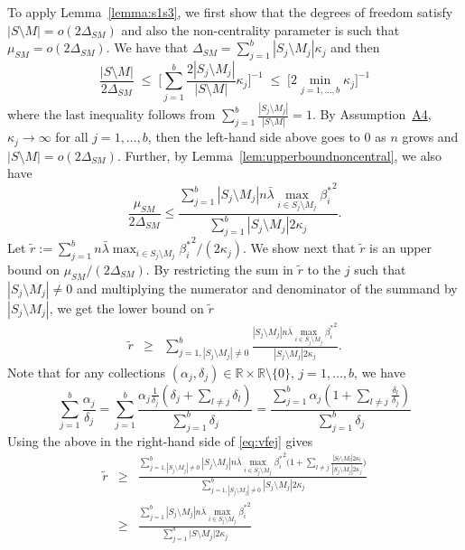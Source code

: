 \documentclass[
  12pt]{article}
\newcommand{\R}{\mathbb{R}}
\begin{document}
To apply Lemma~\ref{lemma:s1s3}, we first show that the degrees of freedom satisfy $|S\setminus M|=o(2\Delta_{SM})$ and also the non-centrality parameter is such that $\mu_{SM}=o(2\Delta_{SM})$.
We have that $\Delta_{SM}=\sum_{j=1}^b|S_j \setminus M_j|\kappa_j$ and then
$$\frac{|S\setminus M|}{2\Delta_{SM}}\;\leq\; \bigg[\sum_{j=1}^b\frac{2|S_j \setminus M_j|}{|S\setminus M|}\kappa_j \bigg]^{-1} \;\leq\; \Big[ 2\min_{j=1,\ldots,b}\kappa_j \Big]^{-1} $$
where the last inequality follows from $\sum_{j=1}^b\frac{|S_j \setminus M_j|}{|S\setminus M|}=1$. By Assumption~\hyperlink{lab:A4}{A4}, $\kappa_j\to \infty$ for all $j=1,\ldots,b$, then the left-hand side above goes to 0 as $n$ grows and $|S\setminus M|=o(2\Delta_{SM})$. Further, by Lemma~\ref{lem:upperboundnoncentral}, we also have
\begin{equation}\label{eq:AGEoj}
    \frac{\mu_{SM}}{2\Delta_{SM}}\leq \frac{ \sum_{j=1}^b |S_j\setminus M_j|n\bar{\lambda}\max_{i\in S_j\setminus M_j}{\beta_i^*}^2}{\sum_{j=1}^b |S_j\setminus M_j|2 \kappa_j}.
\end{equation}
Let $\tilde{r}:=\sum_{j=1}^b n\bar{\lambda}\max_{i\in S_j\setminus M_j}{\beta_i^*}^2/(2\kappa_j)$. We show next that $\tilde{r}$ is an upper bound on $\mu_{SM}/(2\Delta_{SM})$. By restricting the sum in $\tilde{r}$ to the $j$ such that $|S_j\setminus M_j|\neq 0$ and multiplying the numerator and denominator of the summand by $|S_j\setminus M_j|$, we get the lower bound on $\tilde{r}$
\begin{eqnarray}\label{eq:vfej}
    \tilde{r}
    &\geq &\sum_{j=1,|S_j\setminus M_j|\neq 0}^b\frac{|S_j\setminus M_j|n\bar{\lambda}\max_{i\in S_j\setminus M_j}{\beta_i^*}^2}{|S_j\setminus M_j|2\kappa_j} .\end{eqnarray}
Note that for any collections $(\alpha_j,\delta_j)\in  \R\times \R\setminus\{0\}$, $j=1,\ldots,b$, we have
\begin{equation}\label{eq:truc}
    \sum_{j=1}^b\frac{\alpha_j}{\delta_j}=
\sum_{j=1}^b\frac{\alpha_j \frac{1}{\delta_j} (\delta_j + \sum_{l \neq j} \delta_l)}{\sum_{j=1}^b \delta_j}=
    \frac{\sum_{j=1}^b\alpha_j(1+\sum_{l\neq j} \frac{\delta_l}{\delta_j})}{\sum_{j=1}^b\delta_j}
\end{equation}
Using the above in the right-hand side of \eqref{eq:vfej} gives
\begin{eqnarray*}
    \tilde{r}
    &\geq& \frac{\sum_{j=1,|S_j\setminus M_j|\neq 0 }^b|S_j\setminus M_j|n\bar{\lambda}\max_{i\in S_j\setminus M_j}{\beta_i^*}^2\Big(1+\sum_{l\neq j}\frac{|S_l\setminus M_l|2\kappa_l}{|S_j\setminus M_j|2\kappa_j}\Big)}{\sum_{j=1,|S_j\setminus M_j|\neq 0 }^b|S_j\setminus M_j|2\kappa_j} \\
    &\geq & \frac{\sum_{j=1}^b|S_j\setminus M_j|n\bar{\lambda}\max_{i\in S_j\setminus M_j}{\beta_i^*}^2}{\sum_{j=1}^b \big|S\setminus M_j\big|2\kappa_j}
\end{eqnarray*}
\end{document}
